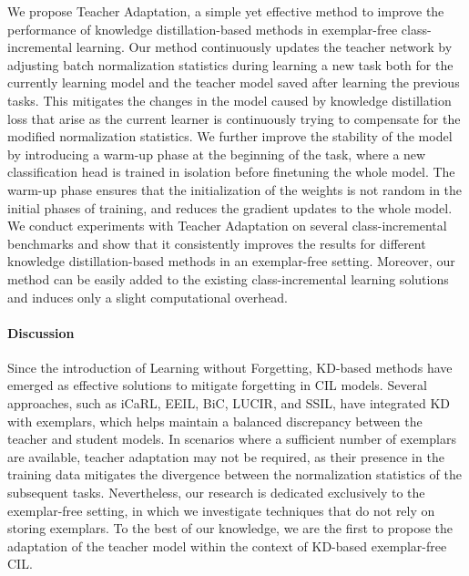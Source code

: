 \documentclass[10pt,twocolumn,letterpaper]{article}
\newcommand\rev[1]{{#1}}
\newcommand\todo[1]{{\color{red} [\bf TODO: #1]}}
\begin{document}
We propose Teacher Adaptation, a simple yet effective method to improve the performance of knowledge distillation-based methods in exemplar-free class-incremental learning. Our method continuously updates the teacher network by adjusting batch normalization statistics during learning a new task both for the currently learning model and the teacher model saved after learning the previous tasks. This mitigates the changes in the model caused by knowledge distillation loss that arise as the current learner is continuously trying to compensate for the modified normalization statistics. We further improve the stability of the model by introducing a warm-up phase at the beginning of the task, where a new classification head is trained in isolation before finetuning the whole model. The warm-up phase ensures that the initialization of the weights is not random in the initial phases of training, and reduces the gradient updates to the whole model.
We conduct experiments with Teacher Adaptation on several class-incremental benchmarks and show that it consistently improves the results for different knowledge distillation-based methods in an exemplar-free setting. Moreover, our method can be easily added to the existing class-incremental learning solutions and induces only a slight computational overhead. 

\vspace{-0.5cm}
\paragraph{Discussion}
Since the introduction of Learning without Forgetting, KD-based methods have emerged as effective solutions to mitigate forgetting in CIL models. Several approaches, such as iCaRL, EEIL, BiC, LUCIR, and SSIL, have integrated KD with exemplars, which helps maintain a balanced discrepancy between the teacher and student models.
\rev{In scenarios where a sufficient number of exemplars are available, teacher adaptation may not be required, as their presence in the training data mitigates the divergence between the normalization statistics of the subsequent tasks.}
Nevertheless, our research is dedicated exclusively to the exemplar-free setting, in which we investigate techniques that do not rely on storing exemplars. To the best of our knowledge, we are the first to propose the adaptation of the teacher model within the context of KD-based exemplar-free CIL.
\end{document}
